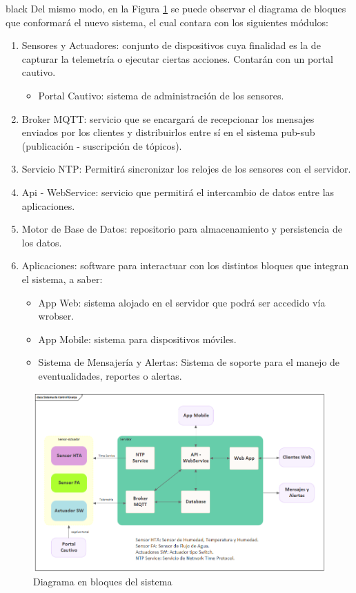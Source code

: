 \documentclass[11pt]{charter}
\begin{document}
\begin{consigna}{black}
Del mismo modo, en la Figura \ref{fig:diagBloques} se puede observar el diagrama de bloques que conformará el nuevo sistema, el cual contara con los siguientes módulos: 
\begin{enumerate}
\item Sensores y Actuadores: conjunto de dispositivos cuya finalidad es la de capturar la telemetría o ejecutar ciertas acciones. Contarán con un portal cautivo.
\begin{itemize}
\item Portal Cautivo: sistema de administración de los sensores.
\end{itemize}
\item Broker MQTT: servicio que se encargará de recepcionar los mensajes enviados por los clientes y distribuirlos entre sí en el sistema pub-sub (publicación - suscripción de tópicos).
\item Servicio NTP: Permitirá sincronizar los relojes de los sensores con el servidor.
\item Api - WebService: servicio que permitirá el intercambio de datos entre las aplicaciones.
\item Motor de Base de Datos: repositorio para almacenamiento y persistencia de los datos.
\item Aplicaciones: software para interactuar con los distintos bloques que integran el sistema, a saber:
	\begin{itemize}
		\item App Web: sistema alojado en el servidor que podrá ser accedido vía wrobser.
		\item App Mobile: sistema para dispositivos móviles.
		\item Sistema de Mensajería y Alertas: Sistema de soporte para el manejo de eventualidades, reportes o alertas.
	\end{itemize}
\end{enumerate}

\vspace{25px}

\begin{figure}[htpb]
\centering 
\includegraphics[width=1\textwidth]{./Figuras/diagBloques.png}
\caption{Diagrama en bloques del sistema}
\label{fig:diagBloques}
\end{figure}

\vspace{25px}
\end{consigna}
\end{document}
